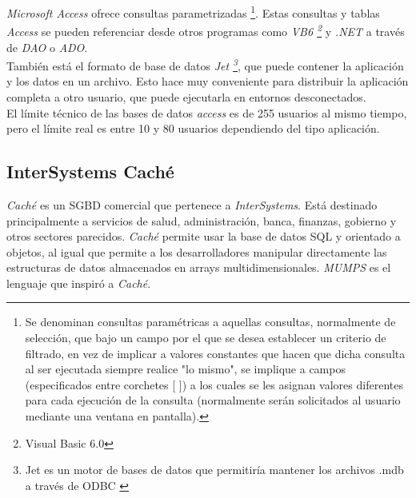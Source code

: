 \documentclass[3pt]{article}
\begin{document}
\emph{Microsoft Access} ofrece consultas parametrizadas \footnote{Se denominan consultas paramétricas a aquellas consultas, normalmente de selección, que bajo un campo por el que se desea establecer un criterio de filtrado, en vez de implicar a valores constantes que hacen que dicha consulta al ser ejecutada siempre realice "lo mismo", se implique a campos (especificados entre corchetes [ ]) a los cuales se les asignan valores diferentes para cada ejecución de la consulta (normalmente serán solicitados al usuario mediante una ventana en pantalla).\cite{ACC:7}}. Estas consultas y tablas \emph{Access} se pueden referenciar desde otros programas como \emph{VB6 \footnote{Visual Basic 6.0}} y \emph{.NET} a través de \emph{DAO} o \emph{ADO}. \cite{ACC:6}\\
También está el formato de base de datos \emph{Jet \footnote{Jet es un motor de bases de datos que permitiría mantener los archivos .mdb a través de ODBC \cite{ACC:8}}}, que puede contener la aplicación y los datos en un archivo. Esto hace muy conveniente para distribuir la aplicación completa a otro usuario, que puede ejecutarla en entornos desconectados. \cite{ACC:6}\\

El límite técnico de las bases de datos \emph{access} es de 255 usuarios al mismo tiempo, pero el límite real es entre 10 y 80 usuarios dependiendo del tipo aplicación. \cite{ACC:4}\\

\subsection{InterSystems Caché}
\emph{Caché} es un SGBD comercial que pertenece a \emph{InterSystems}. Está destinado principalmente a servicios de salud, administración, banca, finanzas, gobierno y otros sectores parecidos. \emph{Caché} permite usar la base de datos SQL y orientado a objetos, al igual que permite a los desarrolladores manipular directamente las estructuras de datos almacenados en arrays multidimensionales. \emph{MUMPS} es el lenguaje que inspiró a \emph{Caché}.\cite{wikiCache}\\
\end{document}
